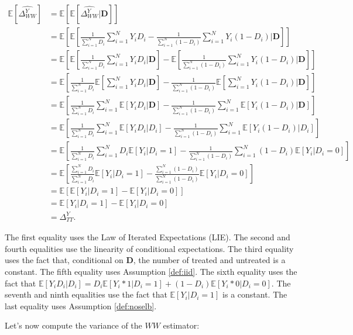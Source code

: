 \documentclass[]{book}
\newcommand{\esp}[1]{\mathbb{E}[ #1 ]}
\theoremstyle{definition}
\theoremstyle{definition}
\theoremstyle{definition}
\theoremstyle{remark}
\begin{document}
\begin{align*}
\esp{\hat{\Delta^Y_{WW}}} & = \esp{\esp{\hat{\Delta^Y_{WW}}|\mathbf{D}}}\\
                          & = \esp{\esp{\frac{1}{\sum_{i=1}^N D_i}\sum_{i=1}^N Y_iD_i-\frac{1}{\sum_{i=1}^N (1-D_i)}\sum_{i=1}^N Y_i(1-D_i)|\mathbf{D}}}\\
                          & = \esp{\esp{\frac{1}{\sum_{i=1}^N D_i}\sum_{i=1}^N Y_iD_i|\mathbf{D}}-\esp{\frac{1}{\sum_{i=1}^N (1-D_i)}\sum_{i=1}^N Y_i(1-D_i)|\mathbf{D}}}\\
                          & = \esp{\frac{1}{\sum_{i=1}^N D_i}\esp{\sum_{i=1}^N Y_iD_i|\mathbf{D}}-\frac{1}{\sum_{i=1}^N (1-D_i)}\esp{\sum_{i=1}^N Y_i(1-D_i)|\mathbf{D}}}\\
                          & = \esp{\frac{1}{\sum_{i=1}^N D_i}\sum_{i=1}^N \esp{Y_iD_i|\mathbf{D}}-\frac{1}{\sum_{i=1}^N (1-D_i)}\sum_{i=1}^N \esp{Y_i(1-D_i)|\mathbf{D}}}\\
                          & = \esp{\frac{1}{\sum_{i=1}^N D_i}\sum_{i=1}^N \esp{Y_iD_i|D_i}-\frac{1}{\sum_{i=1}^N (1-D_i)}\sum_{i=1}^N \esp{Y_i(1-D_i)|D_i}}\\
                          & = \esp{\frac{1}{\sum_{i=1}^N D_i}\sum_{i=1}^N D_i\esp{Y_i|D_i=1}-\frac{1}{\sum_{i=1}^N (1-D_i)}\sum_{i=1}^N(1-D_i)\esp{Y_i|D_i=0}}\\
                          & = \esp{\frac{\sum_{i=1}^N D_i}{\sum_{i=1}^N D_i}\esp{Y_i|D_i=1}-\frac{\sum_{i=1}^N(1-D_i)}{\sum_{i=1}^N (1-D_i)}\esp{Y_i|D_i=0}}\\
                          & = \esp{\esp{Y_i|D_i=1}-\esp{Y_i|D_i=0}}\\
                          & = \esp{Y_i|D_i=1}-\esp{Y_i|D_i=0} \\
                          & = \Delta^Y_{TT}.
\end{align*}

The first equality uses the Law of Iterated Expectations (LIE). The
second and fourth equalities use the linearity of conditional
expectations. The third equality uses the fact that, conditional on
\(\mathbf{D}\), the number of treated and untreated is a constant. The
fifth equality uses Assumption \ref{def:iid}. The sixth equality uses
the fact that
\(\esp{Y_iD_i|D_i}=D_i\esp{Y_i*1|D_i=1}+(1-D_i)\esp{Y_i*0|D_i=0}\). The
seventh and ninth equalities use the fact that \(\esp{Y_i|D_i=1}\) is a
constant. The last equality uses Assumption \ref{def:noselb}.

Let's now compute the variance of the \(WW\) estimator:
\end{document}
